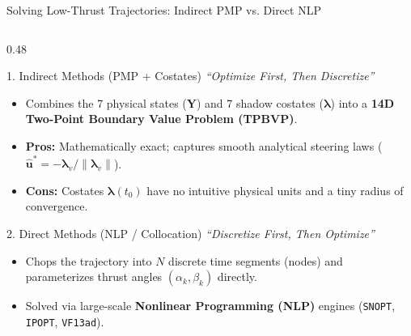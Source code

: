 \documentclass[aspectratio=169, 10pt]{beamer}
\begin{document}
\begin{frame}{Solving Low-Thrust Trajectories: Indirect PMP vs. Direct NLP}
    \begin{columns}[T]
        \begin{column}{0.48\textwidth}
            \begin{block}{1. Indirect Methods (PMP + Costates)}
                \scriptsize
                \textit{``Optimize First, Then Discretize''}
                \begin{itemize}\setlength{\itemsep}{1.2pt}\setlength{\topsep}{0pt}
                    \item Combines the 7 physical states ($\mathbf{Y}$) and 7 shadow costates ($\boldsymbol{\lambda}$) into a \textbf{14D Two-Point Boundary Value Problem (TPBVP)}.
                    \item \textbf{Pros:} Mathematically exact; captures smooth analytical steering laws ($\hat{\mathbf{u}}^* = -\boldsymbol{\lambda}_v/\|\boldsymbol{\lambda}_v\|$).
                    \item \textbf{Cons:} Costates $\boldsymbol{\lambda}(t_0)$ have no intuitive physical units and a tiny radius of convergence.
                \end{itemize}
            \end{block}
            \vspace{-0.15cm}
            \begin{exampleblock}{2. Direct Methods (NLP / Collocation)}
                \scriptsize
                \textit{``Discretize First, Then Optimize''}
                \begin{itemize}\setlength{\itemsep}{1.2pt}\setlength{\topsep}{0pt}
                    \item Chops the trajectory into $N$ discrete time segments (nodes) and parameterizes thrust angles $(\alpha_k, \beta_k)$ directly.
                    \item Solved via large-scale \textbf{Nonlinear Programming (NLP)} engines (\texttt{SNOPT}, \texttt{IPOPT}, \texttt{VF13ad}).
                \end{itemize}
            \end{exampleblock}
        \end{column}


\end{columns}
\end{frame}
\end{document}
